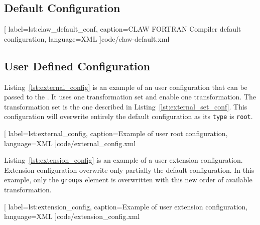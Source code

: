 \subsection{Default Configuration}

  [
    label=lst:claw_default_conf,
    caption=CLAW FORTRAN Compiler default configuration,
    language=XML
  ]{code/claw-default.xml}

\subsection{User Defined Configuration}
Listing~\ref{lst:external_config} is an example of an user configuration that
can be passed to the \clawfcomp. It uses one transformation set and enable
one transformation. The transformation set is the one described in 
Listing~\ref{lst:external_set_conf}. This configuration will overwrite 
entirely the default configuration as its \lstinline!type! is \lstinline!root!.


  [
    label=lst:external_config,
    caption=Example of user root configuration,
    language=XML
  ]{code/external_config.xml}

Listing~\ref{lst:extension_config} is an example of a user extension 
configuration. Extension configuration overwrite only partially the default 
configuration. In this example, only the \lstinline!groups! element is 
overwritten with this new order of available transformation.


  [
    label=lst:extension_config,
    caption=Example of user extension configuration,
    language=XML
  ]{code/extension_config.xml}